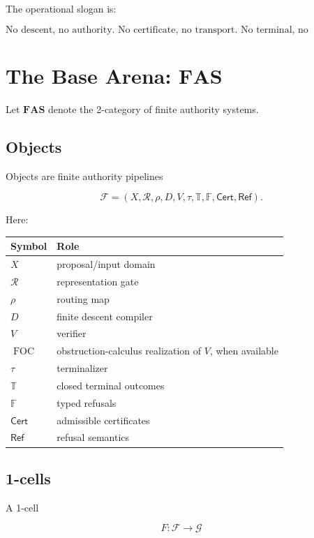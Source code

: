 \documentclass[11pt]{article}
\begin{document}
The operational slogan is:

\[
\boxed{
\text{No descent, no authority. No certificate, no transport. No terminal, no promotion.}
}
\]

\section{The Base Arena: \texorpdfstring{\(\mathbf{FAS}\)}{FAS}}

Let \(\mathbf{FAS}\) denote the 2-category of finite authority systems.

\subsection{Objects}

Objects are finite authority pipelines

\[
\mathcal F
=
(
X,
\mathcal R,
\rho,
D,
V,
\tau,
\mathbb T,
\mathbb F,
\mathsf{Cert},
\mathsf{Ref}
).
\]

Here:

\begin{center}
\begin{tabular}{ll}
\toprule
Symbol & Role \\
\midrule
\(X\) & proposal/input domain \\
\(\mathcal R\) & representation gate \\
\(\rho\) & routing map \\
\(D\) & finite descent compiler \\
\(V\) & verifier \\
\(\operatorname{FOC}\) & obstruction-calculus realization of \(V\), when available \\
\(\tau\) & terminalizer \\
\(\mathbb T\) & closed terminal outcomes \\
\(\mathbb F\) & typed refusals \\
\(\mathsf{Cert}\) & admissible certificates \\
\(\mathsf{Ref}\) & refusal semantics \\
\bottomrule
\end{tabular}
\end{center}

\subsection{1-cells}

A 1-cell

\[
F:\mathcal F\to\mathcal G
\]
\end{document}
